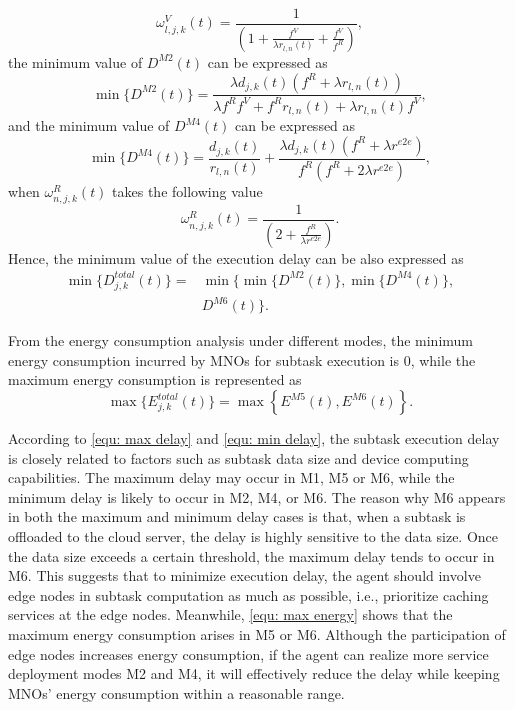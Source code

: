 \documentclass[lettersize,journal]{IEEEtran}
\begin{document}
\begin{equation}
	\omega^{V}_{l,j,k}(t) = \frac{1}{(1+\frac{f^{V}}{\lambda r_{l,n}(t)}+\frac{f^{V}}{f^{R}})}, 
\end{equation}
the minimum value of $ D^{M2}(t) $ can be expressed as
\begin{equation}
	\min\{ D^{M2}(t) \} = \frac{ \lambda d_{j,k}(t) \left( f^{R} + \lambda r_{l,n}(t) \right) }{ \lambda f^{R} f^{V} + f^{R} r_{l,n}(t) + \lambda r_{l,n}(t) f^{V} },
\end{equation}
and the minimum value of $ D^{M4}(t) $ can be expressed as
\begin{equation}
	\min\{ D^{M4}(t) \} = \frac{d_{j,k}(t)}{r_{l,n}(t)} + \frac{ \lambda d_{j,k}(t) \left( f^{R} + \lambda r^{e2e} \right) }{ f^{R} \left( f^{R} + 2\lambda r^{e2e} \right) },
\end{equation}
when $ \omega^{R}_{n,j,k}(t) $ takes the following value
\begin{equation}
	\omega^{R}_{n,j,k}(t) = \frac{1}{(2+ \frac{f^{R}}{\lambda r^{e2e}} )}.
\end{equation}
Hence, the minimum value of the execution delay can be also expressed as 
\begin{equation}
	\label{equ: min delay}
	\begin{aligned}
		\min\{D_{j,k}^{total}(t)\} =& \min \Big\{\min\{D^{M2}(t)\}, \min\{D^{M4}(t)\}, \\
		& D^{M6}(t) \Big\}.
	\end{aligned}
\end{equation}

From the energy consumption analysis under different modes, the minimum energy consumption incurred by MNOs for subtask execution is $0 $, while the maximum energy consumption is represented as
\begin{equation}
	\label{equ: max energy}
	\max\{ E^{total}_{j,k}(t) \} =\max \left\{ E^{M5}(t),E^{M6}(t) \right\}.
\end{equation}

According to \eqref{equ: max delay} and \eqref{equ: min delay}, the subtask execution delay is closely related to factors such as subtask data size and device computing capabilities. The maximum delay may occur in M1, M5 or M6, while the minimum delay is likely to occur in M2, M4, or M6. 
The reason why M6 appears in both the maximum and minimum delay cases is that, when a subtask is offloaded to the cloud server, the delay is highly sensitive to the data size. Once the data size exceeds a certain threshold, the maximum delay tends to occur in M6.
This suggests that to minimize execution delay, the agent should involve edge nodes in subtask computation as much as possible, i.e., prioritize caching services at the edge nodes.  
Meanwhile, \eqref{equ: max energy} shows that the maximum energy consumption arises in  M5 or M6. Although the participation of edge nodes increases energy consumption, if the agent can realize more service deployment modes M2 and M4, it will effectively reduce the delay while keeping MNOs' energy consumption within a reasonable range. 
\end{document}
